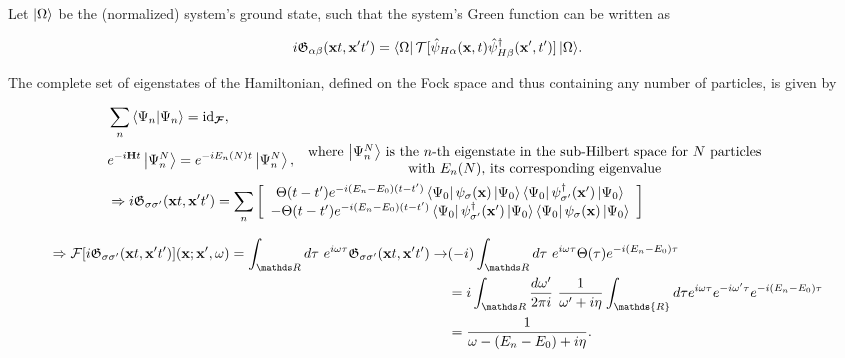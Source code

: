 Let $\ket{\Omega}$ be the (normalized) system's ground state, such that the system's Green function can be written as 

\begin{equation}
    i \mathfrak{G}_{\alpha \beta} ({\bf x}t, {\bf x}'t') = {\bra{\Omega} \mathcal{T} [\hat{\psi}_{H \alpha}({\bf x}, t) \hat{\psi}^\dagger_{H \beta}({\bf x}', t')] \ket{\Omega}}.
\end{equation}

The complete set of eigenstates of the Hamiltonian, defined on the Fock space and thus containing any number of particles, is given by 

\begin{equation*}
    \begin{split}
        &\sum_{n} \bra{\Psi_n}\ket{\Psi_n} = \textnormal{id}_{\bm{\mathcal{F}}}, \\
        &e^{-i{\bf H} t} \ket{\Psi_n^N} = e^{-i E_n(N) t} \ket{\Psi_n^N}, \begin{array}{cc}
             \textnormal{ where $\ket{\Psi_n^N}$ is the $n$-th eigenstate in the sub-Hilbert space for $N$ particles} \\
              \textnormal{ with $E_n(N)$, its corresponding eigenvalue} 
        \end{array} \\
        &\Rightarrow i \mathfrak{G}_{\sigma \sigma'} ({\bf x}t, {\bf x}'t') = \sum_{n} \bigg[\begin{array}{c}
             \Theta(t-t') e^{-i(E_n - E_0)(t-t')} \bra{\Psi_0} \psi_{\sigma}({\bf x}) \ket{\Psi_0} \bra{\Psi_0} \psi_{\sigma'}^\dagger({\bf x}') \ket{\Psi_0}\\
             - \Theta(t-t') e^{-i(E_n - E_0)(t-t')} \bra{\Psi_0} \psi_{\sigma'}^\dagger({\bf x}')\ket{\Psi_0} \bra{\Psi_0} \psi_{\sigma}({\bf x}) \ket{\Psi_0}
        \end{array}\bigg]
     \end{split}
\end{equation*}

\begin{equation*}
     \begin{split}
        \Rightarrow \mathcal{F}[i \mathfrak{G}_{\sigma \sigma'} ({\bf x}t, {\bf x}'t')]({\bf x}; {\bf x}',\omega) = \int_{\R} d\tau \blanky e^{i\omega\tau}\mathfrak{G}_{\sigma \sigma'} ({\bf x}t, {\bf x}'t') \rightarrow & (-i) \int_{\R} d\tau \blanky e^{i\omega \tau} \Theta(\tau) e^{-i(E_n-E_0) \tau} \\
        &= i \int_{\R} \frac{d\omega'}{2\pi i} \blanky \frac{1}{\omega'+i\eta} \int_{\mathds{R}} d\tau e^{i\omega \tau}e^{-i\omega' \tau} e^{- i(E_n - E_0)\tau} \\
        &= \frac{1}{\omega - (E_n-E_0) + i\eta}.
     \end{split}
\end{equation*}

